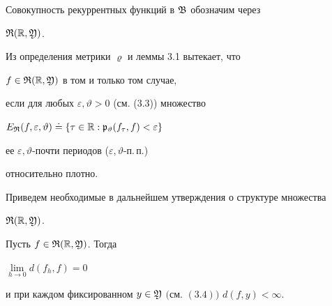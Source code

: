 Совокупность рекуррентных функций в $\frak B$ обозначим через


$\frak R(\Bbb R,\frak Y)$.





Из определения метрики $\varrho$ и леммы 3.1 вытекает, что


$f\in\frak R(\Bbb R,\frak Y)$ в том и только том случае,


если для любых $\varepsilon,\vartheta>0$ (см. (3.3)) множество


$E_{\frak R}(f,\varepsilon,\vartheta)


\doteq\{\tau\in\Bbb R:\frak p_\vartheta(f_\tau,f)<\varepsilon\}$


ее $\varepsilon,\vartheta$-почти периодов ($\varepsilon,\vartheta$-п.\,п.)


относительно плотно.





Приведем необходимые в дальнейшем утверждения о структуре множества


$\frak R(\Bbb R,\frak Y)$.








\begin{lems}


Пусть $f\in\frak R(\Bbb R,\frak Y)$. Тогда


$\lim\limits_{h\to0}d(f_h,f)=0$


и при каждом фиксированном $y\in\frak Y$ $($см. $(3.4))$ $d(f,y)<\infty$.


\end{lems}








